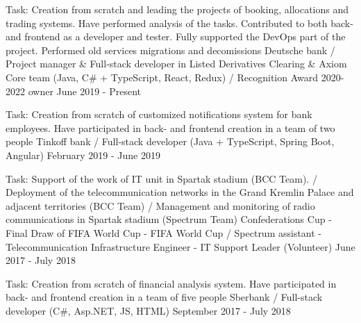 

\vspace{0cm}\begin{cventries}
\cventry
{Task: Creation from scratch and leading the projects of booking, allocations and trading systems. Have performed analysis of the tasks. Contributed to both back- and frontend as a developer and tester. Fully supported the DevOps part of the project. Performed old services migrations and decomissions
} %
{Deutsche bank / Project manager \& Full-stack developer in Listed Derivatives Clearing \& Axiom Core team (Java, C\# + TypeScript, React, Redux) / Recognition Award 2020-2022 owner} %
{} %
{June 2019 - Present} %
\noindent	
	
\cventry
{Task: Creation from scratch of customized notifications system for bank employees. Have participated in back- and frontend creation in a team of two people} %
{Tinkoff bank / Full-stack developer (Java + TypeScript, Spring Boot, Angular)} %
{} %
{February 2019 - June 2019} %
\noindent	
	
\cventry
{Task: Support of the work of IT unit in Spartak stadium (BCC Team). /
Deployment of the telecommunication networks in the Grand Kremlin Palace and adjacent territories (BCC Team) /
Management and monitoring of radio communications in Spartak stadium (Spectrum Team)} %
{Confederations Cup - Final Draw of FIFA World Cup - FIFA World Cup / 
	Spectrum assistant - Telecommunication Infrastructure Engineer  - IT Support Leader (Volunteer)} %
{} %
{June 2017 - July 2018} %
\noindent	

\cventry
{Task: Creation from scratch of financial analysis system. Have participated in back- and frontend creation in a team of five people} %
{Sberbank / Full-stack developer (C\#, Asp.NET, JS, HTML)} %
{} %
{September 2017 - July 2018} %
\noindent	




\end{cventries}
